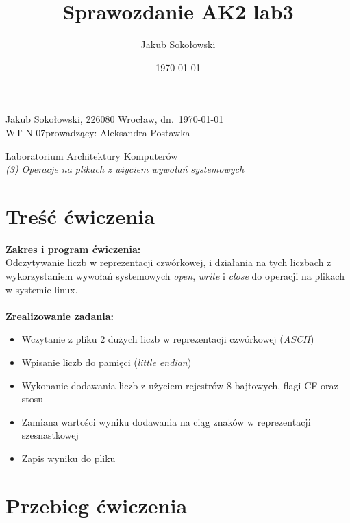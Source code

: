 \documentclass[11pt]{report}
\title{Sprawozdanie AK2 lab3}
\date{\today}
\author{Jakub Sokołowski}
\newcommand{\LabNum}{3}
\begin{document}
\noindent
Jakub Sokołowski, 226080
  \hfill Wrocław, dn.\ {\AdvanceDate[-1]\today}\\
WT-N-07\hfill  prowadzący: Aleksandra Postawka\\
\vspace{1cm}
\begin{center}
  \begin{Large}
  	Laboratorium Architektury Komputerów\\
    \emph{(\LabNum) Operacje na plikach z użyciem wywołań systemowych\\}
  \end{Large}
\end{center}


\section{Treść ćwiczenia}
\label{sec:tresc-cwiczenia}
\textbf{Zakres i program ćwiczenia:}\\
Odczytywanie liczb w reprezentacji czwórkowej, i działania na tych liczbach z 
wykorzystaniem wywołań systemowych \textit{open}, \textit{write} i \textit{close} do operacji na plikach w systemie linux.
\\
\\
\textbf{Zrealizowanie zadania:}
\begin{itemize}[leftmargin=*,topsep=0pt]
	\item Wczytanie z pliku 2 dużych liczb w reprezentacji czwórkowej (\textit{ASCII})
	\item Wpisanie liczb do pamięci (\textit{little endian})
	\item Wykonanie dodawania liczb z użyciem rejestrów 8-bajtowych, flagi CF oraz stosu
	\item Zamiana wartości wyniku dodawania na ciąg znaków w reprezentacji szesnastkowej
	\item Zapis wyniku do pliku
\end{itemize}
\newpage
\section{Przebieg ćwiczenia}
\label{sec:przebieg-cwiczenia}
\end{document}
